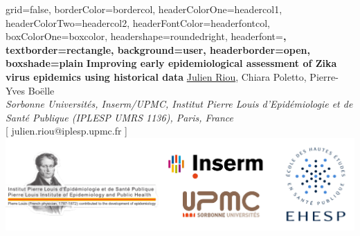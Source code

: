 \documentclass[a0paper,portrait]{baposter}
\begin{document}
\begin{poster}{
grid=false,
borderColor=bordercol, %
headerColorOne=headercol1, %
headerColorTwo=headercol2, %
headerFontColor=headerfontcol, %
boxColorOne=boxcolor, %
headershape=roundedright, %
headerfont=\Large\sf\bf, %
textborder=rectangle,
background=user,
headerborder=open, %
boxshade=plain
}
{}
%
%
{\sf\bf \huge{ Improving  early epidemiological  assessment of Zika virus epidemics  using historical data}} %
{ \underline{Julien Riou}, Chiara Poletto, Pierre-Yves Boëlle\\ %
{\smaller \textit{ Sorbonne Universités, Inserm/UPMC, Institut Pierre Louis d’Epidémiologie et de Santé Publique (IPLESP UMRS 1136), Paris, France} \\ 
 \small{[ julien.riou@iplesp.upmc.fr ]}}} %
{\includegraphics[scale=.25]{logos2.pdf}} %


\end{poster}
\end{document}
